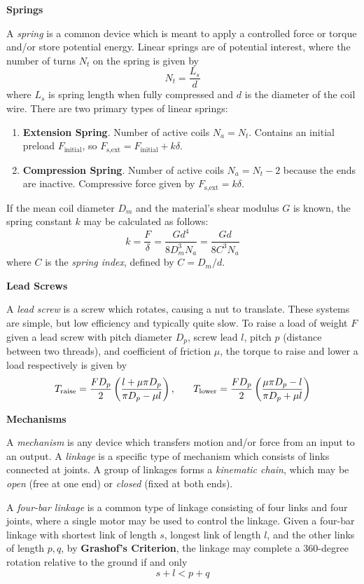 \newpage

\textbf{Springs}

A \textit{spring} is a common device which is meant to apply a controlled force or torque and/or store potential energy. Linear springs are of potential interest, where the number of turns $N_t$ on the spring is given by \[N_t = \frac{L_s}{d}\] where $L_s$ is spring length when fully compressed and $d$ is the diameter of the coil wire. There are two primary types of linear springs:
\begin{enumerate}
    \item[] \textbf{Extension Spring}. Number of active coils $N_a = N_t$. Contains an initial preload $F_\text{initial}$, so $F_\text{s,ext} = F_\text{initial} + k\delta$.
    \item[] \textbf{Compression Spring}. Number of active coils $N_a = N_t - 2$ because the ends are inactive. Compressive force given by $F_\text{s,ext} = k\delta$.
\end{enumerate}

If the mean coil diameter $D_m$ and the material's shear modulus $G$ is known, the spring constant $k$ may be calculated as follows: \[k = \frac{F}{\delta} = \frac{Gd^4}{8D_m^3N_a} = \frac{Gd}{8C^3N_a}\] where $C$ is the \textit{spring index}, defined by $C = D_m/d$.

\textbf{Lead Screws}

A \textit{lead screw} is a screw which rotates, causing a nut to translate. These systems are simple, but low efficiency and typically quite slow. To raise a load of weight $F$ given a lead screw with pitch diameter $D_p$, screw lead $l$, pitch $p$ (distance between two threads), and coefficient of friction $\mu$, the torque to raise and lower a load respectively is given by \[T_\text{raise} = \frac{FD_p}{2}\left(\frac{l+\mu\pi D_p}{\pi D_p - \mu l}\right),\hspace{0.25in} T_\text{lower} = \frac{FD_p}{2}\left(\frac{\mu \pi D_p - l}{\pi D_p + \mu l}\right)\]

\textbf{Mechanisms}

A \textit{mechanism} is any device which transfers motion and/or force from an input to an output. A \textit{linkage} is a specific type of mechanism which consists of links connected at joints. A group of linkages forms a \textit{kinematic chain}, which may be \textit{open} (free at one end) or \textit{closed} (fixed at both ends). 

A \textit{four-bar linkage} is a common type of linkage consisting of four links and four joints, where a single motor may be used to control the linkage. Given a four-bar linkage with shortest link of length $s$, longest link of length $l$, and the other links of length $p,q$, by \textbf{Grashof's Criterion}, the linkage may complete a 360-degree rotation relative to the ground if and only \[s+l < p+q\]

